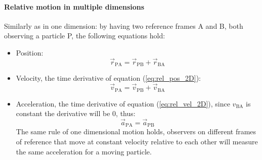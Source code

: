\documentclass{scrartcl}
\begin{document}
    \paragraph{Relative motion in multiple dimensions} Similarly as in one dimension: by having two reference frames A and B, both observing a particle P, the following equations hold:
    \begin{itemize}
        \item Position:
        \begin{equation} \label{eq:rel_pos_2D}
            \vec{r}_{\mathrm{PA}} = \vec{r}_{\mathrm{PB}} + \vec{r}_{\mathrm{BA}}
        \end{equation}
        \item Velocity, the time derivative of equation (\ref{eq:rel_pos_2D}):
        \begin{equation} \label{eq:rel_vel_2D}
            \vec{v}_{\mathrm{PA}} = \vec{v}_{\mathrm{PB}} + \vec{v}_{\mathrm{BA}}
        \end{equation}
        \item Acceleration, the time derivative of equation (\ref{eq:rel_vel_2D}), since $v_{\mathrm{BA}}$ is constant the derivative will be $0$, thus:
        \begin{equation}
            \vec{a}_{\mathrm{PA}} = \vec{a}_{\mathrm{PB}}
        \end{equation}
        The same rule of one dimensional motion holds, observers on different frames of reference that move at constant velocity relative to each other will measure the same acceleration for a moving particle. 
    \end{itemize}
\end{document}
